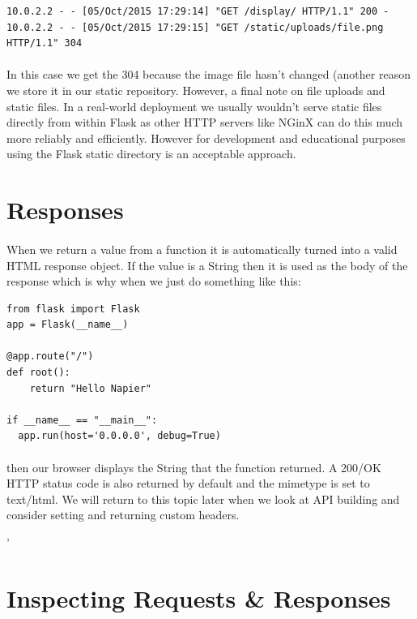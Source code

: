 \documentclass[12pt, a4paper, oneside]{book}
\begin{document}
\begin{lstlisting}[style=DOS]
10.0.2.2 - - [05/Oct/2015 17:29:14] "GET /display/ HTTP/1.1" 200 -
10.0.2.2 - - [05/Oct/2015 17:29:15] "GET /static/uploads/file.png HTTP/1.1" 304
\end{lstlisting}

\paragraph{} In this case we get the 304 because the image file hasn't changed (another reason we store it in our static repository. However, a final note on file uploads and static files. In a real-world deployment we usually wouldn't serve static files directly from within Flask as other HTTP servers like NGinX can do this much more reliably and efficiently. However for development and educational purposes using the Flask static directory is an acceptable approach.


\section{Responses}
\label{responses}
\paragraph{} When we return a value from a function it is automatically turned into a valid HTML response object. If the value is a String then it is used as the body of the response which is why when we just do something like this:

\begin{lstlisting}
from flask import Flask
app = Flask(__name__)

@app.route("/")
def root():
    return "Hello Napier"

if __name__ == "__main__":
  app.run(host='0.0.0.0', debug=True)
\end{lstlisting}

\paragraph{} then our browser displays the String that the function returned. A 200/OK HTTP status code is also returned by default and the mimetype is set to text/html. We will return to this topic later when we look at API building and consider setting and returning custom headers.


'\section{Inspecting Requests \& Responses}
\label{inspecting-requests-and-responses}
\end{document}
